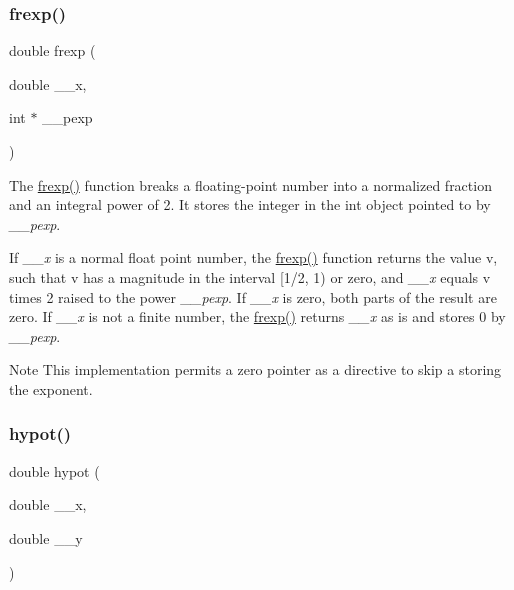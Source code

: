 \subsubsection{\texorpdfstring{frexp()}{frexp()}}
{\footnotesize\ttfamily double frexp (\begin{DoxyParamCaption}\item[{double}]{\+\_\+\+\_\+x,  }\item[{int $\ast$}]{\+\_\+\+\_\+pexp }\end{DoxyParamCaption})}

The \hyperlink{group__avr__math_ga89f0cb053e3cdb0c9c952ef040087c80}{frexp()} function breaks a floating-\/point number into a normalized fraction and an integral power of 2. It stores the integer in the {\ttfamily int} object pointed to by {\itshape \+\_\+\+\_\+pexp}.

If {\itshape \+\_\+\+\_\+x} is a normal float point number, the \hyperlink{group__avr__math_ga89f0cb053e3cdb0c9c952ef040087c80}{frexp()} function returns the value {\ttfamily v}, such that {\ttfamily v} has a magnitude in the interval \mbox{[}1/2, 1) or zero, and {\itshape \+\_\+\+\_\+x} equals {\ttfamily v} times 2 raised to the power {\itshape \+\_\+\+\_\+pexp}. If {\itshape \+\_\+\+\_\+x} is zero, both parts of the result are zero. If {\itshape \+\_\+\+\_\+x} is not a finite number, the \hyperlink{group__avr__math_ga89f0cb053e3cdb0c9c952ef040087c80}{frexp()} returns {\itshape \+\_\+\+\_\+x} as is and stores 0 by {\itshape \+\_\+\+\_\+pexp}.

\begin{DoxyNote}{Note}
This implementation permits a zero pointer as a directive to skip a storing the exponent. 
\end{DoxyNote}
\mbox{\label{group__avr__math_gacb9c5b29c1ee2aed4d0f2d412a12f777}} 
\subsubsection{\texorpdfstring{hypot()}{hypot()}}
{\footnotesize\ttfamily double hypot (\begin{DoxyParamCaption}\item[{double}]{\+\_\+\+\_\+x,  }\item[{double}]{\+\_\+\+\_\+y }\end{DoxyParamCaption})}

